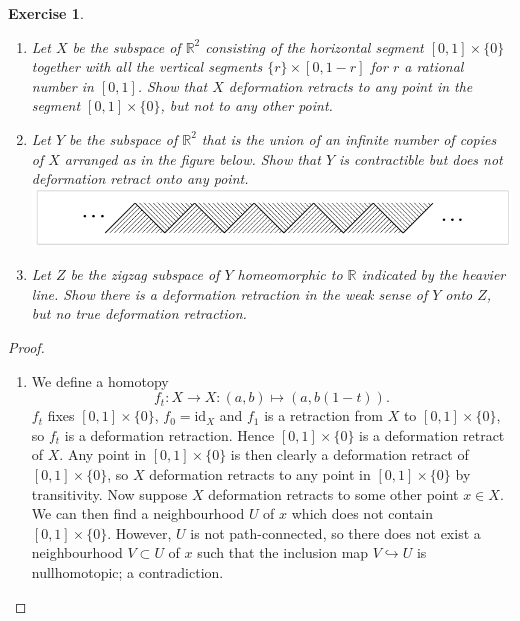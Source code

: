 \documentclass{article}
\newtheorem{exercise}[theorem]{Exercise}
\begin{document}
\begin{exercise}
\begin{enumerate}
\item[(a)] Let $X$ be the subspace of $\mathbb{R}^2$ consisting of the horizontal segment $[0,1]\times\{0\}$ together with all the vertical segments $\{r\}\times[0,1-r]$ for $r$ a rational number in $[0,1]$. Show that $X$ deformation retracts to any point in the segment $[0,1]\times\{0\}$, but not to any other point.
\item[(b)] Let $Y$ be the subspace of $\mathbb{R}^2$ that is the union of an infinite number of copies of $X$ arranged as in the figure below. Show that $Y$ is contractible but does not deformation retract onto any point.
\includegraphics[scale=0.5]{Screenshot 2025-07-20 at 19-46-35 AT.dvi - AT.pdf.png}
\item[(c)] Let $Z$ be the zigzag subspace of $Y$ homeomorphic to $\mathbb{R}$ indicated by the heavier line. Show there is a deformation retraction in the weak sense of $Y$ onto $Z$, but no true deformation retraction.
\end{enumerate}
\end{exercise}
\begin{proof}
\begin{enumerate}
\item[(a)] We define a homotopy \[f_t:X\to X:(a,b) \mapsto (a,b(1-t)).\] $f_t$ fixes $[0,1]\times\{0\}$, $f_0=\text{id}_X$ and $f_1$ is a retraction from $X$ to $[0,1]\times\{0\}$, so $f_t$ is a deformation retraction. Hence $[0,1]\times\{0\}$ is a deformation retract of $X$. Any point in $[0,1]\times\{0\}$ is then clearly a deformation retract of $[0,1]\times\{0\}$, so  $X$ deformation retracts to any point in $[0,1]\times\{0\}$ by transitivity. Now suppose $X$ deformation retracts to some other point $x\in X$. We can then find a neighbourhood $U$ of $x$ which does not contain $[0,1]\times\{0\}$. However, $U$ is not path-connected, so there does not exist a neighbourhood $V\subset U$ of $x$ such that the inclusion map $V\hookrightarrow U$ is nullhomotopic; a contradiction.
\end{enumerate}
\end{proof}
\end{document}
